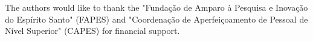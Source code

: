 The authors would like to thank the "Fundação de Amparo à Pesquisa e Inovação do Espírito Santo" (FAPES) and "Coordenação de Aperfeiçoamento de Pessoal de Nível Superior" (CAPES) for financial support.